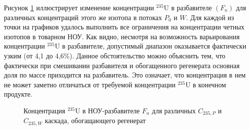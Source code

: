 

Рисунок \ref{fig3__7} иллюстрирует изменение концентрации $^{235}$U в разбавителе $(F_n)$ для различных концентраций этого же изотопа в потоках $P_0$ и $W$. Для каждой из точки на графиков удалось выполнить все ограничения на концентрации четных изотопов в товарном НОУ. Как видно, несмотря на возможность варьирования концентрации $^{235}$U в разбавителе, допустимый диапазон оказывается фактически узким (от 4,1 до 4,6\%). Данное обстоятельство можно объяснить тем, что фактически при смешивании разбавителя и обогащенного регенерата основная доля по массе приходится на разбавитель. Это означает, что концентрация в нем не может заметно отличаться от требуемой концентрации $^{235}$U в конечном продукте.   

\begin{figure}[ht]
  \caption{Концентрация $^{235}$U в НОУ-разбавителе $F_n$ для различных $C_{235, P}$ и $C_{235, W}$ каскада, обогащающего регенерат}\label{fig3__7}
\end{figure}

